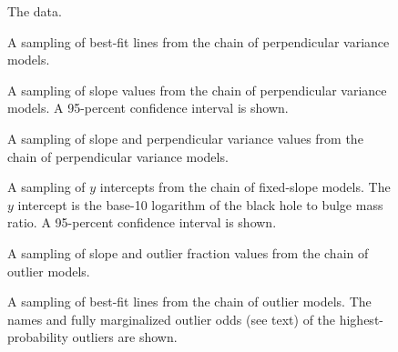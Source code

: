 \documentclass[12pt,preprint]{aastex}
\begin{document}
\clearpage
\begin{figure}
\caption{The data.}
\end{figure}

\clearpage
\begin{figure}
\caption{A sampling of best-fit lines from the chain of perpendicular
  variance models.}
\end{figure}

\clearpage
\begin{figure}
\caption{A sampling of slope values from the chain of perpendicular
  variance models.  A 95-percent confidence interval is shown.}
\end{figure}

\clearpage
\begin{figure}
\caption{A sampling of slope and perpendicular variance values from
  the chain of perpendicular variance models.}
\end{figure}

\clearpage
\begin{figure}
\caption{A sampling of $y$ intercepts from the chain of fixed-slope
  models.  The $y$ intercept is the base-10 logarithm of the black
  hole to bulge mass ratio.  A 95-percent confidence interval is
  shown.}
\end{figure}

\clearpage
\begin{figure}
\caption{A sampling of slope and outlier fraction values from the
  chain of outlier models.}
\end{figure}

\clearpage
\begin{figure}
\caption{A sampling of best-fit lines from the chain of outlier
  models.  The names and fully marginalized outlier odds (see text) of
  the highest-probability outliers are shown.}
\end{figure}
\end{document}
